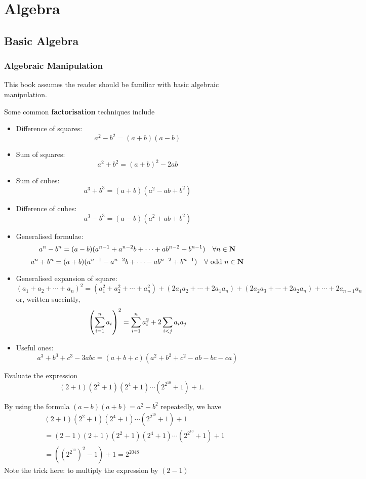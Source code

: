\part{Algebra}
\chapter{Basic Algebra}
\section{Algebraic Manipulation}
This book assumes the reader should be familiar with basic algebraic manipulation.

Some common \textbf{factorisation} techniques include
\begin{itemize}
\item Difference of squares:
\[ a^2-b^2=(a+b)(a-b) \]
\item Sum of squares:
\[ a^2+b^2=(a+b)^2-2ab \]
\item Sum of cubes:
\[ a^3+b^3=(a+b)(a^2-ab+b^2) \]
\item Difference of cubes:
\[ a^3-b^3=(a-b)(a^2+ab+b^2) \]
\item Generalised formulae:
\[ a^n-b^n=(a-b)(a^{n-1}+a^{n-2}b+\cdots+ab^{n-2}+b^{n-1}) \quad \forall n\in\mathbf N \]
\[ a^n+b^n=(a+b)(a^{n-1}-a^{n-2}b+\cdots-ab^{n-2}+b^{n-1}) \quad \forall \text{ odd } n\in\mathbf N \]
\item Generalised expansion of square:
\[ (a_1+a_2+\cdots+a_n)^2=(a_1^2+a_2^2+\cdots+a_n^2)+(2a_1a_2+\cdots+2a_1a_n)+(2a_2a_3+\cdots+2a_2a_n)+\cdots+2a_{n-1}a_n \]
or, written succintly,
\[\left(\sum_{i=1}^n a_i\right)^2=\sum_{i=1}^n a_i^2+2\sum_{i<j}a_ia_j\]
\item Useful ones:
\[ a^3+b^3+c^3-3abc=(a+b+c)(a^2+b^2+c^2-ab-bc-ca) \]
\end{itemize}

\begin{exercise}
Evaluate the expression
\[ (2+1)(2^2+1)(2^4+1)\cdots(2^{2^{10}}+1)+1. \]
\end{exercise}

\begin{solution}
By using the formula $(a-b)(a+b)=a^2-b^2$ repeatedly, we have 
\begin{align*}
&(2+1)(2^2+1)(2^4+1)\cdots(2^{2^{10}}+1)+1 \\
&= (2-1)(2+1)(2^2+1)(2^4+1)\cdots(2^{2^{10}}+1)+1 \\
&= ((2^{2^{10}})^2-1)+1=\boxed{2^{2048}}
\end{align*}
Note the trick here: to multiply the expression by $(2-1)$
\end{solution}

